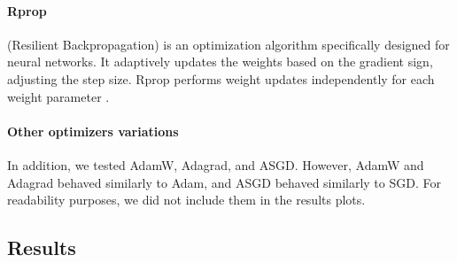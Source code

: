 \paragraph{Rprop}
(Resilient Backpropagation) is an optimization algorithm specifically designed for neural networks.
It adaptively updates the weights based on the gradient sign, adjusting the step size.
Rprop performs weight updates independently for each weight parameter \cite{Riedmiller1992}.
\paragraph{Other optimizers variations}
In addition, we tested AdamW, Adagrad, and ASGD.
However, AdamW and Adagrad behaved similarly to Adam, and ASGD behaved similarly to SGD.
For readability purposes, we did not include them in the results plots.

\subsection{Results}

